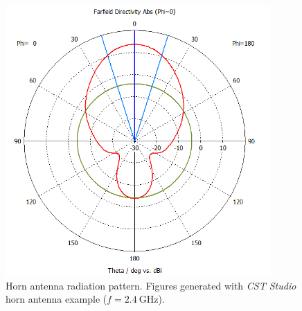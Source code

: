 \begin{figure}[H]
\begin{minipage}{0.45\textwidth}
        \includegraphics[width=0.9\textwidth]{figures/farfield (f=2.4) horn_1.png} %
    \end{minipage}
    \caption{Horn antenna radiation pattern. Figures generated with \textit{CST Studio} horn antenna example ($f=\SI{2.4}{\giga\hertz}$).}
    \label{fig:horn_1}
\end{figure}


